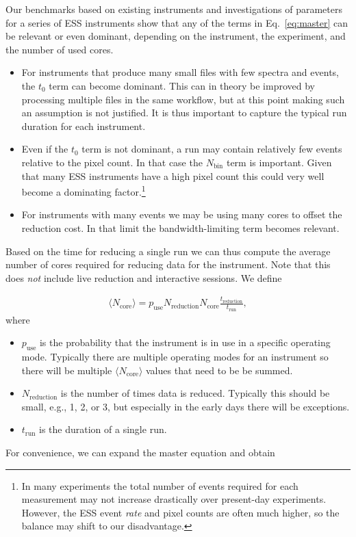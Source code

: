 \documentclass[a4paper,english,numbers=noenddot,bibliography=totoc,chapterprefix=on,DIV=12]{scrartcl}
\newcommand{\Treduction}{t_{\text{reduction}}}
\newcommand{\Trun}{t_{\text{run}}}
\newcommand{\Nbin}{N_{\text{bin}}}
\newcommand{\Ncore}{N_{\text{core}}}
\newcommand{\Ncoremean}{\langle N_{\text{core}}\rangle}
\newcommand{\Nreduction}{N_{\text{reduction}}}
\begin{document}
Our benchmarks based on existing instruments and investigations of parameters for a series of ESS instruments show that any of the terms in Eq.~\eqref{eq:master} can be relevant or even dominant, depending on the instrument, the experiment, and the number of used cores.

\begin{itemize}
  \item 
    For instruments that produce many small files with few spectra and events, the $t_0$ term can become dominant.
    This can in theory be improved by processing multiple files in the same workflow, but at this point making such an assumption is not justified.
    It is thus important to capture the typical run duration for each instrument.
  \item
    Even if the $t_0$ term is not dominant, a run may contain relatively few events relative to the pixel count.
    In that case the $\Nbin$ term is important.
    Given that many ESS instruments have a high pixel count this could very well become a dominating factor.\footnote{In many experiments the total number of events required for each measurement may not increase drastically over present-day experiments. However, the ESS event \emph{rate} and pixel counts are often much higher, so the balance may shift to our disadvantage.}
  \item
    For instruments with many events we may be using many cores to offset the reduction cost.
    In that limit the bandwidth-limiting term becomes relevant.
\end{itemize}

Based on the time for reducing a single run we can thus compute the average number of cores required for reducing data for the instrument.
Note that this does \emph{not} include live reduction and interactive sessions.
We define

\begin{align}
  \Ncoremean = p_{\text{use}}\Nreduction \Ncore \frac{\Treduction}{\Trun},
\end{align}
where

\begin{itemize}
  \item $p_{\text{use}}$ is the probability that the instrument is in use in a specific operating mode.
  Typically there are multiple operating modes for an instrument so there will be multiple $\Ncoremean$ values that need to be be summed.
  \item $\Nreduction$ is the number of times data is reduced.
    Typically this should be small, e.g., 1, 2, or 3, but especially in the early days there will be exceptions.
  \item $\Trun$ is the duration of a single run.
\end{itemize}
For convenience, we can expand the master equation and obtain
\end{document}
